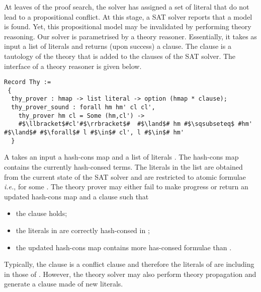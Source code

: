 \documentclass[a4paper,UKenglish,cleveref, autoref, thm-restate]{lipics-v2019}
\begin{document}
At leaves of the proof search, the solver has assigned a set of
literal that do not lead to a propositional conflict. At this stage, a
SAT solver reports that a model is found.
%
Yet, this propositional model may be invalidated by performing theory reasoning.
%
Our solver is parametrised by a theory reasoner. Essentially, it takes
as input a list of literals and returns (upon success) a clause. The
clause is a tautology of the theory that is added to the clauses of
the SAT solver.
%
The interface of a theory reasoner is given below.
\begin{verbatim}
Record Thy :=
 {
  thy_prover : hmap -> list literal -> option (hmap * clause);
  thy_prover_sound : forall hm hm' cl cl',
    thy_prover hm cl = Some (hm,cl') ->
    #$\llbracket$#cl'#$\rrbracket$#  #$\land$# hm #$\sqsubseteq$ #hm' #$\land$# #$\forall$# l #$\in$# cl', l #$\in$# hm'
  }
\end{verbatim}
A  takes an input a hash-cons map  and a
list of literals .  The hash-cons map  contains the
currently hash-consed terms. The literals in the list  are
obtained from the current state of the SAT solver and are restricted
to atomic formulae \emph{i.e.},  for some .
%
The theory prover may either fail to make progress or return an
updated hash-cons map  and a clause  such that
\begin{itemize}
\item the clause  holds;
\item the literals in  are correctly hash-consed in ;
\item the updated hash-cons map  contains more has-consed formulae than .
\end{itemize}
Typically, the clause  is a conflict clause and therefore
the literals of  are including in those of
. However, the theory solver may also perform theory
propagation and generate a clause made of new literals.
%
\end{document}
